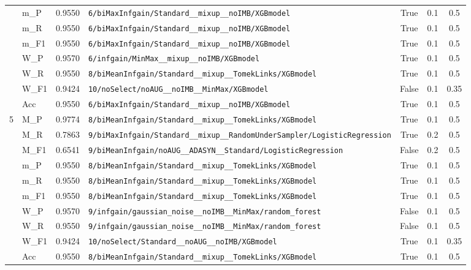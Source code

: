 \begin{table}[htbp]
\begin{tabular}{|c|l|c|>{\ttfamily\footnotesize}p{7.2cm}|c|c|c|}
 & m\_P & 0.9550 & \texttt{6/biMaxInfgain/Standard\_\_mixup\_\_noIMB/XGBmodel} & True & 0.1 & 0.5 \\
 & m\_R & 0.9550 & \texttt{6/biMaxInfgain/Standard\_\_mixup\_\_noIMB/XGBmodel} & True & 0.1 & 0.5 \\
 & m\_F1 & 0.9550 & \texttt{6/biMaxInfgain/Standard\_\_mixup\_\_noIMB/XGBmodel} & True & 0.1 & 0.5 \\
 & W\_P & 0.9570 & \texttt{6/infgain/MinMax\_\_mixup\_\_noIMB/XGBmodel} & True & 0.1 & 0.5 \\
 & W\_R & 0.9550 & \texttt{8/biMeanInfgain/Standard\_\_mixup\_\_TomekLinks/XGBmodel} & True & 0.1 & 0.5 \\
 & W\_F1 & 0.9424 & \texttt{10/noSelect/noAUG\_\_noIMB\_\_MinMax/XGBmodel} & False & 0.1 & 0.35 \\
 & Acc & 0.9550 & \texttt{6/biMaxInfgain/Standard\_\_mixup\_\_noIMB/XGBmodel} & True & 0.1 & 0.5 \\
\hline
\multirow{10}{*}{5} & M\_P & 0.9774 & \texttt{8/biMeanInfgain/Standard\_\_mixup\_\_TomekLinks/XGBmodel} & True & 0.1 & 0.5 \\
 & M\_R & 0.7863 & \texttt{9/biMaxInfgain/Standard\_\_mixup\_\_RandomUnderSampler/LogisticRegression} & True & 0.2 & 0.5 \\
 & M\_F1 & 0.6541 & \texttt{9/biMeanInfgain/noAUG\_\_ADASYN\_\_Standard/LogisticRegression} & False & 0.2 & 0.5 \\
 & m\_P & 0.9550 & \texttt{8/biMeanInfgain/Standard\_\_mixup\_\_TomekLinks/XGBmodel} & True & 0.1 & 0.5 \\
 & m\_R & 0.9550 & \texttt{8/biMeanInfgain/Standard\_\_mixup\_\_TomekLinks/XGBmodel} & True & 0.1 & 0.5 \\
 & m\_F1 & 0.9550 & \texttt{8/biMeanInfgain/Standard\_\_mixup\_\_TomekLinks/XGBmodel} & True & 0.1 & 0.5 \\
 & W\_P & 0.9570 & \texttt{9/infgain/gaussian\_noise\_\_noIMB\_\_MinMax/random\_forest} & False & 0.1 & 0.5 \\
 & W\_R & 0.9550 & \texttt{9/infgain/gaussian\_noise\_\_noIMB\_\_MinMax/random\_forest} & False & 0.1 & 0.5 \\
 & W\_F1 & 0.9424 & \texttt{10/noSelect/Standard\_\_noAUG\_\_noIMB/XGBmodel} & True & 0.1 & 0.35 \\
 & Acc & 0.9550 & \texttt{8/biMeanInfgain/Standard\_\_mixup\_\_TomekLinks/XGBmodel} & True & 0.1 & 0.5 \\
\hline
\end{tabular}
\end{table}
